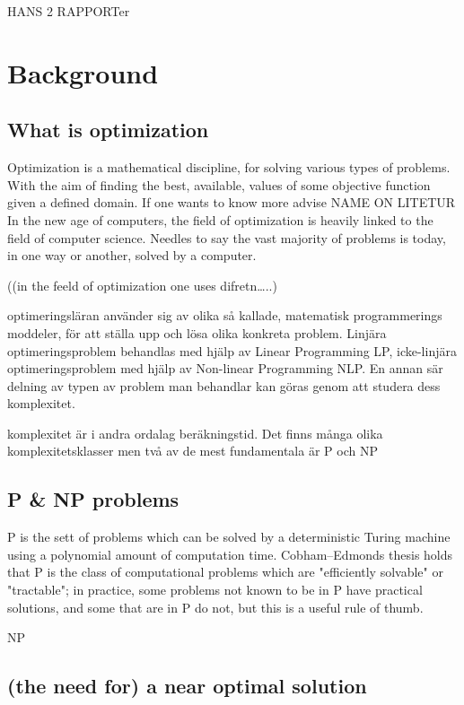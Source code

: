 HANS  2 RAPPORTer

\section{Background}

\subsection{What is optimization}

Optimization is a mathematical discipline, for solving various types of problems. With the aim of finding the best, available, values of some objective function given a defined domain. If one wants to know more advise NAME ON LITETUR\\

In the new age of computers, the field of optimization is heavily linked to the field of computer science. Needles to say the vast majority of problems is today, in one way or another, solved by a computer.

((in the feeld of optimization one uses difretn…..)

optimeringsläran använder sig av olika så kallade, matematisk programmerings moddeler, för att ställa upp och lösa olika konkreta problem. Linjära optimeringsproblem behandlas med hjälp av Linear Programming LP, icke-linjära optimeringsproblem med hjälp av Non-linear Programming NLP. En annan sär delning av typen av problem man behandlar kan göras genom att studera dess komplexitet. 

komplexitet är i andra ordalag beräkningstid. Det finns många olika komplexitetsklasser men två av de mest fundamentala är P och NP

\subsection{P \& NP problems}

P is the sett of problems which can be solved by a deterministic Turing machine using a polynomial amount of computation time.
Cobham–Edmonds thesis holds that P is the class of computational problems which are "efficiently solvable" or "tractable"; in practice, some problems not known to be in P have practical solutions, and some that are in P do not, but this is a useful rule of thumb.

NP

\subsection{(the need for) a near optimal solution}


